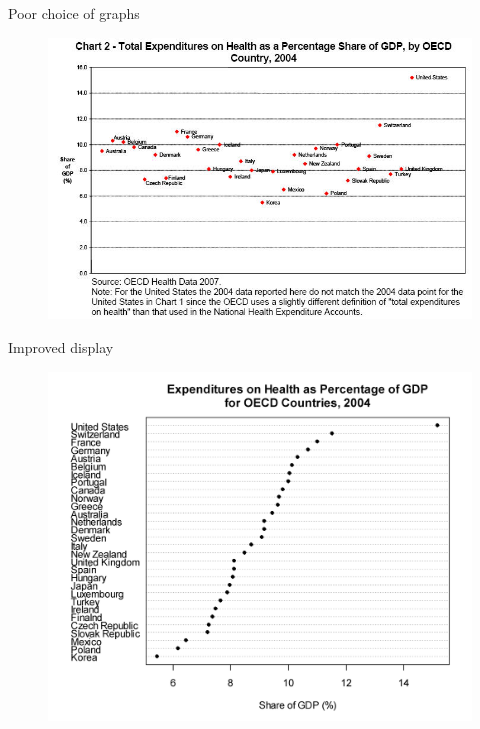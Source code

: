 \documentclass[12pt,english,pdf,dvipsnames,handout]{beamer}
\begin{document}
\begin{frame}{Poor choice of graphs}

\begin{figure}
	\centering
	\includegraphics[scale=0.55]{../04-graphs/21_OECD_health}
\end{figure}

\end{frame}


\begin{frame}{Improved display}

\begin{figure}
	\centering
	\includegraphics[scale=0.08]{../04-graphs/28_OECD_health_improved}
\end{figure}

\end{frame}
\end{document}
